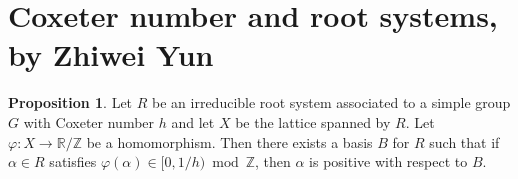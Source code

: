 \documentclass[11pt,a4paper]{article}
\theoremstyle{plain}
\theoremstyle{definition}
\newtheorem{propositionA}{Proposition}
\newcommand{\ZZ}{\mathbb{Z}}
\newcommand{\RR}{\mathbb{R}}
\begin{document}
\appendix
\section{Coxeter number and root systems, by Zhiwei Yun}
\label{app:A}

\begin{propositionA} \label{prop:A1}
Let $R$ be an irreducible root system associated to a simple group $G$ with Coxeter number $h$ and let $X$ be the lattice spanned by $R$. Let $\varphi : X \to \RR/\ZZ$ be a homomorphism. Then there exists a basis $B$ for $R$ such that if $\alpha \in R$ satisfies $\varphi(\alpha) \in [0, 1/h) \bmod \ZZ$, then $\alpha$ is positive with respect to $B$.
\end{propositionA}
\end{document}
